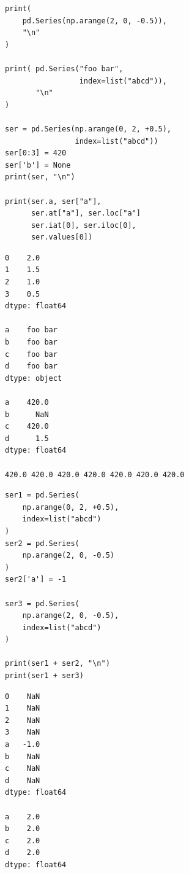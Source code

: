 \begin{frame}[fragile]
%
\begin{tcbraster}[raster columns=2,
                  raster equal height,
                  nobeforeafter,
                  raster column skip=0.5cm]
\begin{codebox}
\begin{verbatim}
print(
    pd.Series(np.arange(2, 0, -0.5)),
    "\n"
)

print( pd.Series("foo bar",
                 index=list("abcd")),
       "\n"
)

ser = pd.Series(np.arange(0, 2, +0.5),
                index=list("abcd"))
ser[0:3] = 420
ser['b'] = None
print(ser, "\n")

print(ser.a, ser["a"],
      ser.at["a"], ser.loc["a"]
      ser.iat[0], ser.iloc[0],
      ser.values[0])
\end{verbatim}
\end{codebox}
%
\begin{cmdbox}
\begin{verbatim}
0    2.0
1    1.5
2    1.0
3    0.5
dtype: float64

a    foo bar
b    foo bar
c    foo bar
d    foo bar
dtype: object

a    420.0
b      NaN
c    420.0
d      1.5
dtype: float64

420.0 420.0 420.0 420.0 420.0 420.0 420.0
\end{verbatim}
\end{cmdbox}
\end{tcbraster}
%
\end{frame}


\begin{frame}[fragile]
%
\begin{tcbraster}[raster columns=2,
                  raster equal height,
                  nobeforeafter,
                  raster column skip=0.5cm]
\begin{codebox}
\begin{verbatim}
ser1 = pd.Series(
    np.arange(0, 2, +0.5),
    index=list("abcd")
)
ser2 = pd.Series(
    np.arange(2, 0, -0.5)
)
ser2['a'] = -1

ser3 = pd.Series(
    np.arange(2, 0, -0.5),
    index=list("abcd")
)

print(ser1 + ser2, "\n")
print(ser1 + ser3)
\end{verbatim}
\end{codebox}
%
\begin{cmdbox}
\begin{verbatim}
0    NaN
1    NaN
2    NaN
3    NaN
a   -1.0
b    NaN
c    NaN
d    NaN
dtype: float64

a    2.0
b    2.0
c    2.0
d    2.0
dtype: float64
\end{verbatim}
\end{cmdbox}
\end{tcbraster}
%
\end{frame}

